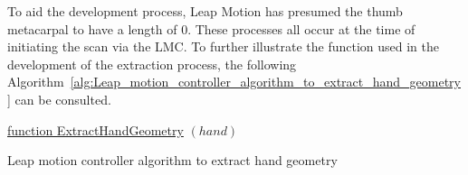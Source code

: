 

To aid the development process, Leap Motion has presumed the thumb metacarpal to have a length of 0.
These processes all occur at the time of initiating the scan via the LMC. To further illustrate the function used in the development of the extraction process, the following Algorithm~\ref{alg:Leap_motion_controller_algorithm_to_extract_hand_geometry} can be consulted.
    




\begin{algorithm}[H]

    \underline{function ExtractHandGeometry} $(hand)$\;
    \caption{Leap motion controller algorithm to extract hand geometry}     
    \label{alg:Leap_motion_controller_algorithm_to_extract_hand_geometry}
\end{algorithm}



